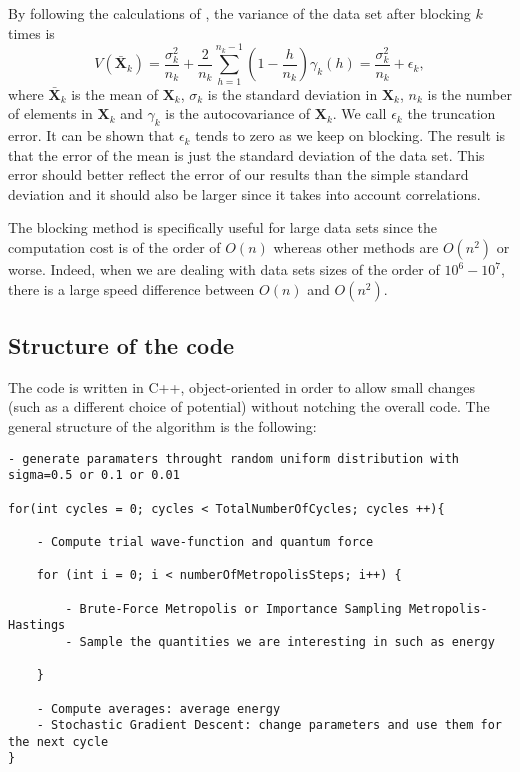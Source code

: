 By following the calculations of \cite{marius}, the variance of the data set after blocking $k$ times is
\begin{equation*}
V(\bar{\textbf{X}}_k) = \frac{\sigma^2_k}{n_k} + \frac{2}{n_k}\sum_{h=1}^{n_k-1}\left(  1-\frac{h}{n_k} \right)\gamma_k(h) = \frac{\sigma^2_k}{n_k} + \epsilon_k ,
\end{equation*}
where $\bar{\textbf{X}}_k$ is the mean of $\textbf{X}_k$, $\sigma_k$ is the standard deviation in $\textbf{X}_k$, $n_k$ is the number of elements in $\textbf{X}_k$ and $\gamma_k$ is the autocovariance of $\textbf{X}_k$. We call $\epsilon_k$ the truncation error. It can be shown \cite{marius} that $\epsilon_k$ tends to zero as we keep on blocking. The result is that the error of the mean is just the standard deviation of the data set. This error should better reflect the error of our results than the simple standard deviation and it should also be larger since it takes into account correlations.

The blocking method is specifically useful for large data sets since the computation cost is of the order of $O(n)$ whereas other methods are $O(n^2)$ or worse. Indeed, when we are dealing with data sets sizes of the order of $10^6 - 10^7$, there is a large speed difference between $O(n)$ and $O(n^2)$. 

\subsection{Structure of the code}
The code is written in C++, object-oriented in order to allow small changes (such as a different choice of potential) without notching the overall code. The general structure of the algorithm is the following:
  
\begin{lstlisting}
- generate paramaters throught random uniform distribution with sigma=0.5 or 0.1 or 0.01

for(int cycles = 0; cycles < TotalNumberOfCycles; cycles ++){
	
	- Compute trial wave-function and quantum force
	
	for (int i = 0; i < numberOfMetropolisSteps; i++) {
	
		- Brute-Force Metropolis or Importance Sampling Metropolis-Hastings
		- Sample the quantities we are interesting in such as energy
	
	}
	
	- Compute averages: average energy
	- Stochastic Gradient Descent: change parameters and use them for the next cycle
}
\end{lstlisting} 


